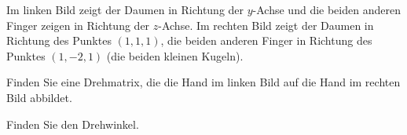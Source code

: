 Im linken Bild zeigt der Daumen in Richtung der $y$-Achse und die beiden
anderen Finger zeigen in Richtung der $z$-Achse.
Im rechten Bild zeigt der Daumen in Richtung des Punktes $(1,1,1)$, die
beiden anderen Finger in Richtung des Punktes $(1,-2,1)$ (die beiden kleinen
Kugeln).
\begin{center}
\end{center}
\begin{teilaufgaben}
\item Finden Sie eine Drehmatrix, die die Hand im linken Bild auf die
Hand im rechten Bild abbildet.
\item Finden Sie den Drehwinkel.
\end{teilaufgaben}

